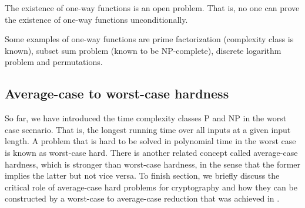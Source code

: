 \documentclass[../main.tex]{subfiles}
\begin{document}
The existence of one-way functions is an open problem. That is, no one can prove the existence of one-way functions unconditionally. 

Some examples of one-way functions are prime factorization (complexity class is known), subset sum problem (known to be NP-complete), discrete logarithm problem and permutations. 
\fi 



\subsection{Average-case to worst-case hardness}
\label{subsec:averagecasehard}

So far, we have introduced the time complexity classes P and NP in the worst case scenario. That is, the longest running time over all inputs at a given input length. A problem that is hard to be solved in polynomial time in the worst case is known as worst-case hard. There is another related concept called average-case hardness,  which is stronger than worst-case hardness, in the sense that the former implies the latter but not vice versa. To finish section, we briefly discuss the critical role of average-case hard problems for cryptography and how they can be constructed by a worst-case to average-case reduction  that was achieved in \citet{ajtai1996generating}. 

\end{document}
